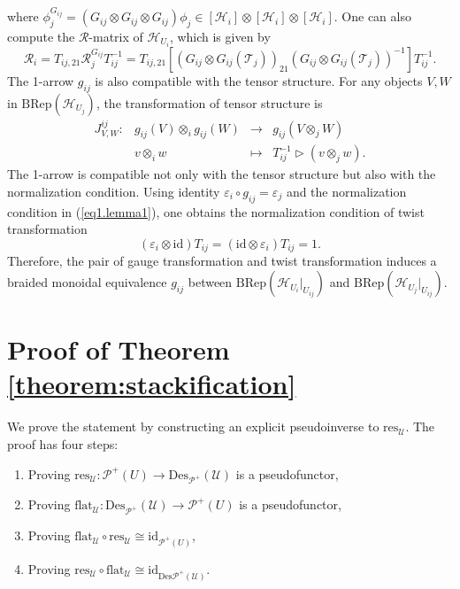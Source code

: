 \documentclass[reqno]{amsart}
\theoremstyle{definition}
\theoremstyle{remark}
\begin{document}
where $ \phi_j^{G_{ij}} = \left(G_{ij}\otimes G_{ij}\otimes G_{ij}\right)\phi_j\in \left[\mathscr{H}_i\right]\otimes \left[\mathscr{H}_i\right]\otimes\left[\mathscr{H}_i\right]$. One can also compute the $\mathcal{R}$-matrix of $\mathscr{H}_{U_i}$, which is given by
\begin{equation}
    \mathcal{R}_i = T_{ij,21}\mathcal{R}_j^{G_{ij}}T_{ij}^{-1}= T_{ij,21}\left[\left( G_{ij}\otimes G_{ij}(\mathcal{T}_j) \right)_{21}\left( G_{ij}\otimes G_{ij}(\mathcal{T}_j) \right)^{-1}\right]T_{ij}^{-1}.
\end{equation}
The 1-arrow $g_{ij}$ is also compatible with the tensor structure. For any objects $V,W$ in $\text{BRep}(\mathscr{H}_{U_j})$, the transformation of tensor structure is
\begin{equation}
    \begin{array}{rccc}
J_{V,W}^{ij}: & g_{ij}(V)\otimes_i g_{ij}(W) & \longrightarrow & g_{ij}(V\otimes_j W) \\
   & v\otimes_i w & \longmapsto  & T_{ij}^{-1} \triangleright(v\otimes_j w).
\end{array}
\end{equation}
The 1-arrow is compatible not only with the tensor structure but also with the normalization condition. Using identity $\varepsilon_i \circ g_{ij}=\varepsilon_j$ and the normalization condition in (\ref{eq1.lemma1}), one obtains the normalization condition of twist transformation
\begin{equation}
    (\varepsilon_i \otimes \text{id})T_{ij} = (\text{id} \otimes \varepsilon_i)T_{ij}= 1.
\end{equation}
Therefore, the pair of gauge transformation and twist transformation induces a braided monoidal equivalence $g_{ij}$ between $\text{BRep}(\mathscr{H}_{U_i}|_{U_{ij}})$ and $\text{BRep}(\mathscr{H}_{U_j}|_{U_{ij}})$.

\section{Proof of Theorem \ref{theorem:stackification}}\label{appendix 3}
We prove the statement by constructing an explicit pseudoinverse to $\text{res}_{\mathcal{U}}$. The proof has four steps:
\begin{enumerate}
    \item Proving $\text{res}_{\mathcal{U}}:\mathscr{P}^+(U)  \longrightarrow \text{Des}_{\mathscr{P}^+}(\mathcal{U})$ is a pseudofunctor,
    \item Proving $\text{flat}_{\mathcal{U}}: \text{Des}_{\mathscr{P}^+}(\mathcal{U}) \longrightarrow \mathscr{P}^+(U) $ is a pseudofunctor,
    \item Proving $ \text{flat}_{\mathcal{U}}\circ \text{res}_{\mathcal{U}}
\cong
\text{id}_{\mathscr{P}^+(U)}$,
\item Proving $\text{res}_{\mathcal{U}}\circ \text{flat}_{\mathcal{U}}
\cong\text{id}_{\text{Des}{\mathscr{P}^+}(\mathcal{U})}$.
\end{enumerate}
\end{document}
